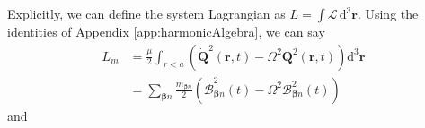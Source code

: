 \documentclass{article}
\begin{document}
Explicitly, we can define the system Lagrangian as $L = \int\mathcal{L}\,\mathrm{d}^3\mathbf{r}$. Using the identities of Appendix \ref{app:harmonicAlgebra}, we can say
\begin{equation}
\begin{split}
L_m &= \frac{\mu}{2}\int_{r<a}\left(\dot{\mathbf{Q}}^2(\mathbf{r},t) - \Omega^2\mathbf{Q}^2(\mathbf{r},t)\right)\mathrm{d}^3\mathbf{r}\\
&= \sum_{\bm{\beta}n}\frac{m_{\bm{\beta}n}}{2}\left(\dot{\mathcal{B}}_{\bm{\beta}n}^2(t) - \Omega^2\mathcal{B}_{\bm{\beta}n}^2(t)\right)
\end{split}
\end{equation}
and
\end{document}
